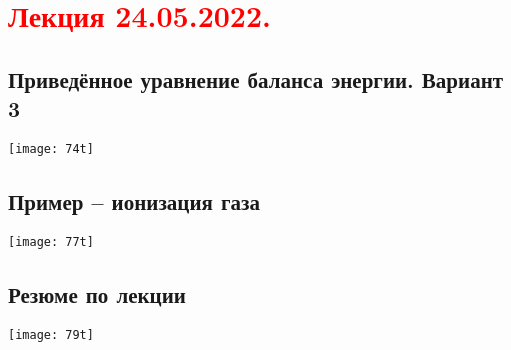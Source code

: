 \documentclass[main.tex]{subfiles}
\begin{document}
\section{\textcolor{red}{Лекция 24.05.2022.}}

\subsection{Приведённое уравнение баланса энергии. Вариант 3}
\texttt{[image: 74t]}



\subsection{Пример -- ионизация газа}
\texttt{[image: 77t]}



\subsection{Резюме по лекции}
\texttt{[image: 79t]}


\end{document}
